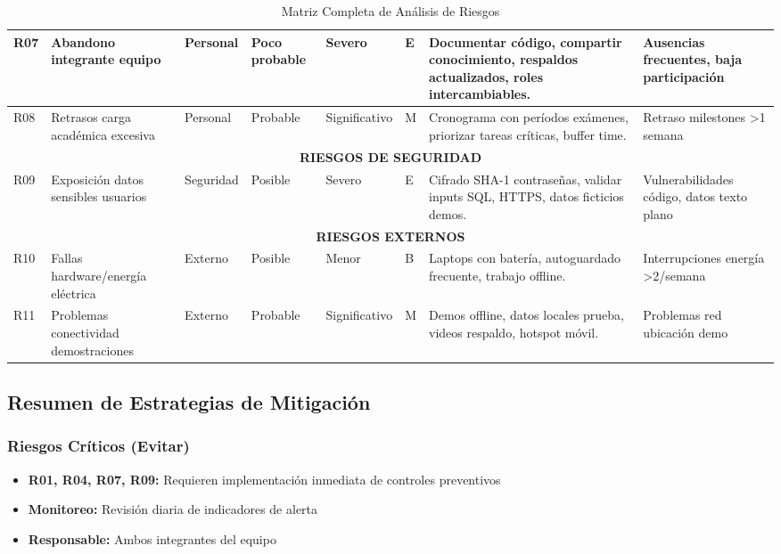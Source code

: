 \begin{table}[H]
\begin{tabular}{|p{0.6cm}|p{2.8cm}|p{1cm}|p{1cm}|p{1cm}|p{0.6cm}|p{3.5cm}|p{1.8cm}|}
R07 & Abandono integrante equipo & Personal & Poco probable & Severo & E & Documentar código, compartir conocimiento, respaldos actualizados, roles intercambiables. & Ausencias frecuentes, baja participación \\
\hline

R08 & Retrasos carga académica excesiva & Personal & Probable & Significativo & M & Cronograma con períodos exámenes, priorizar tareas críticas, buffer time. & Retraso milestones >1 semana \\
\hline

\multicolumn{8}{|c|}{\textbf{RIESGOS DE SEGURIDAD}} \\
\hline

R09 & Exposición datos sensibles usuarios & Seguridad & Posible & Severo & E & Cifrado SHA-1 contraseñas, validar inputs SQL, HTTPS, datos ficticios demos. & Vulnerabilidades código, datos texto plano \\
\hline

\multicolumn{8}{|c|}{\textbf{RIESGOS EXTERNOS}} \\
\hline

R10 & Fallas hardware/energía eléctrica & Externo & Posible & Menor & B & Laptops con batería, autoguardado frecuente, trabajo offline. & Interrupciones energía >2/semana \\
\hline

R11 & Problemas conectividad demostraciones & Externo & Probable & Significativo & M & Demos offline, datos locales prueba, videos respaldo, hotspot móvil. & Problemas red ubicación demo \\
\hline

\end{tabular}
\caption{Matriz Completa de Análisis de Riesgos}
\label{tab:analisis-riesgos-completo}
\end{table}

\subsection{Resumen de Estrategias de Mitigación}

\subsubsection{Riesgos Críticos (Evitar)}
\begin{itemize}
    \item \textbf{R01, R04, R07, R09:} Requieren implementación inmediata de controles preventivos
    \item \textbf{Monitoreo:} Revisión diaria de indicadores de alerta
    \item \textbf{Responsable:} Ambos integrantes del equipo
\end{itemize}

